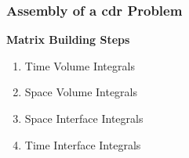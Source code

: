 \begin{frame} %
    \frametitle{Assembly of a \acrshort{cdr} Problem}


    \vspace*{\fill}
    \begin{multicols}{2}
        
        \vspace*{\fill}
        \begin{center}
            {\color{\accentcolor} \Large \textbf{Matrix Building Steps}}
            \vspace*{0.5cm}

            \begin{minipage}{0.4\textwidth}
                \begin{enumerate}[<+>]
                    \item<2> Time Volume Integrals
                    \item<3> Space Volume Integrals
                    \item<4> Space Interface Integrals
                    \item<5> Time Interface Integrals
                \end{enumerate}
            \end{minipage}
        \end{center}
        \vspace*{\fill}

        \vfill\null
        \columnbreak

        \vspace*{\fill}





\end{multicols}
\end{frame}
